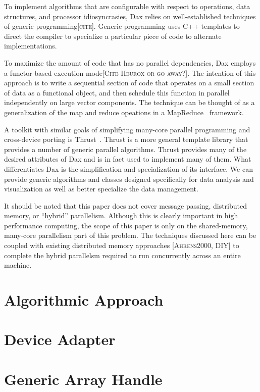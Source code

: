 \documentclass{sig-alternate}
\newcommand*{\lcite}[1]{~\cite{#1}}
\newcommand{\fix}[1]{{\color{red}\textsc{[#1]}}}
\begin{document}
\noindent
To implement algorithms that are configurable with respect to operations,
data structures, and processor idiosyncrasies, Dax relies on
well-established techniques of generic programming\fix{cite}.  Generic
programming uses C++ templates to direct the compiler to specialize a
particular piece of code to alternate implementations.

To maximize the amount of code that has no parallel dependencies, Dax
employs a functor-based execution mode\fix{Cite Heurox or go away?}.  The
intention of this approach is to write a sequential section of code that
operates on a small section of data as a functional object, and then
schedule this function in parallel independently on large vector
components.  The technique can be thought of as a generalization of the map
and reduce opeations in a MapReduce\lcite{MapReduce} framework.

A toolkit with similar goals of simplifying many-core parallel programming
and cross-device porting is Thrust\lcite{Thrust}.  Thrust is a more general
template library that provides a number of generic parallel algorithms.
Thrust provides many of the desired attributes of Dax and is in fact used
to implement many of them.  What differentiates Dax is the simplification
and specialization of its interface.  We can provide generic algorithms and
classes designed specifically for data analysis and visualization as well
as better specialize the data management.

It should be noted that this paper does not cover message passing,
distributed memory, or ``hybrid'' parallelism.  Although this is clearly
important in high performance computing, the scope of this paper is only on
the shared-memory, many-core parallelism part of this problem.  The
techniques discussed here can be coupled with existing distributed memory
approaches \fix{Ahrens2000, DIY} to complete the hybrid parallelsm
required to run concurrently across an entire machine.

\section{Algorithmic Approach}

\section{Device Adapter}

\section{Generic Array Handle}



\end{document}
